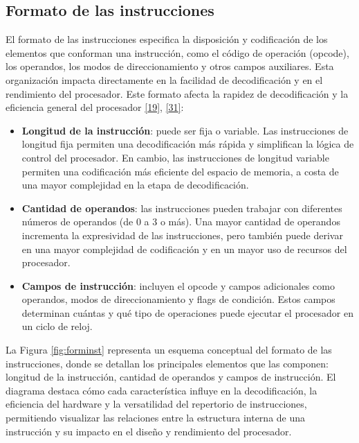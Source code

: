 \documentclass[12pt,oneside]{templates/unerthesis}
\providecommand{\tightlist}{%
  \setlength{\itemsep}{0pt}\setlength{\parskip}{0pt}}
\begin{document}
\hypertarget{formato-de-las-instrucciones}{%
\subsection{Formato de las instrucciones}\label{formato-de-las-instrucciones}}

El formato de las instrucciones especifica la disposición y codificación de los elementos que conforman una instrucción, como el código de operación (opcode), los operandos, los modos de direccionamiento y otros campos auxiliares. Esta organización impacta directamente en la facilidad de decodificación y en el rendimiento del procesador. Este formato afecta la rapidez de decodificación y la eficiencia general del procesador \protect\hyperlink{ref-hennessy2017computer}{{[}19{]}}, \protect\hyperlink{ref-tanenbaum_structured_2016}{{[}31{]}}:

\begin{itemize}
\tightlist
\item
  \textbf{Longitud de la instrucción}: puede ser fija o variable. Las instrucciones de longitud fija permiten una decodificación más rápida y simplifican la lógica de control del procesador. En cambio, las instrucciones de longitud variable permiten una codificación más eficiente del espacio de memoria, a costa de una mayor complejidad en la etapa de decodificación.
\item
  \textbf{Cantidad de operandos}: las instrucciones pueden trabajar con diferentes números de operandos (de 0 a 3 o más). Una mayor cantidad de operandos incrementa la expresividad de las instrucciones, pero también puede derivar en una mayor complejidad de codificación y en un mayor uso de recursos del procesador.
\item
  \textbf{Campos de instrucción}: incluyen el opcode y campos adicionales como operandos, modos de direccionamiento y flags de condición. Estos campos determinan cuántas y qué tipo de operaciones puede ejecutar el procesador en un ciclo de reloj.
\end{itemize}

La Figura \ref{fig:forminst} representa un esquema conceptual del formato de las instrucciones, donde se detallan los principales elementos que las componen: longitud de la instrucción, cantidad de operandos y campos de instrucción. El diagrama destaca cómo cada característica influye en la decodificación, la eficiencia del hardware y la versatilidad del repertorio de instrucciones, permitiendo visualizar las relaciones entre la estructura interna de una instrucción y su impacto en el diseño y rendimiento del procesador.
\end{document}
